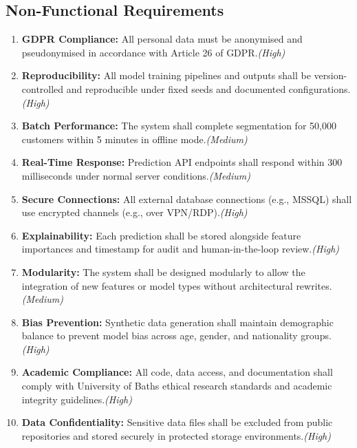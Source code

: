 \documentclass[12pt,a4paper]{report}
\begin{document}
\subsection{Non-Functional Requirements}

\begin{enumerate}[label=NFR\arabic*:]
  \item \textbf{GDPR Compliance:} All personal data must be anonymised and pseudonymised in accordance with Article 26 of GDPR.\hfill \textit{(High)}
  
  \item \textbf{Reproducibility:} All model training pipelines and outputs shall be version-controlled and reproducible under fixed seeds and documented configurations.\hfill \textit{(High)}
  
  \item \textbf{Batch Performance:} The system shall complete segmentation for 50,000 customers within 5 minutes in offline mode.\hfill \textit{(Medium)}
  
  \item \textbf{Real-Time Response:} Prediction API endpoints shall respond within 300 milliseconds under normal server conditions.\hfill \textit{(Medium)}
  
  \item \textbf{Secure Connections:} All external database connections (e.g., MSSQL) shall use encrypted channels (e.g., over VPN/RDP).\hfill \textit{(High)}
  
  \item \textbf{Explainability:} Each prediction shall be stored alongside feature importances and timestamp for audit and human-in-the-loop review.\hfill \textit{(High)}
  
  \item \textbf{Modularity:} The system shall be designed modularly to allow the integration of new features or model types without architectural rewrites.\hfill \textit{(Medium)}
  
  \item \textbf{Bias Prevention:} Synthetic data generation shall maintain demographic balance to prevent model bias across age, gender, and nationality groups.\hfill \textit{(High)}
  
  \item \textbf{Academic Compliance:} All code, data access, and documentation shall comply with University of Baths ethical research standards and academic integrity guidelines.\hfill \textit{(High)}
  
  \item \textbf{Data Confidentiality:} Sensitive data files shall be excluded from public repositories and stored securely in protected storage environments.\hfill \textit{(High)}
\end{enumerate}
\end{document}
